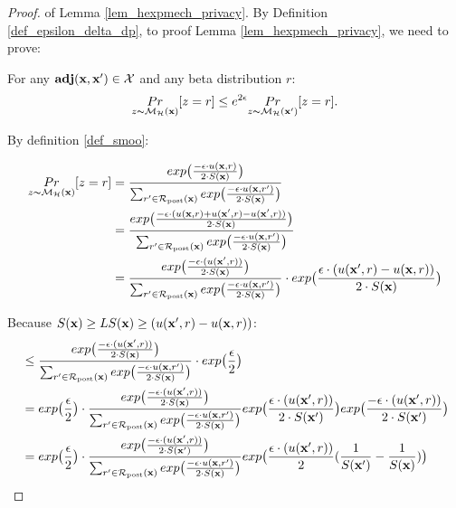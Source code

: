 \documentclass{article}
\begin{document}
\begin{proof} of Lemma \ref{lem_hexpmech_privacy}.
  By Definition \ref{def_epsilon_delta_dp}, to proof Lemma \ref{lem_hexpmech_privacy}, we need to prove:

  For any $\adj{\dataobs}{\dataobs'} \in \mathcal{X}$ and any beta distribution $r$:
  \begin{equation*}
  \hexpmechPr{\dataobs}{z = r} \leq e^{2\epsilon} \hexpmechPr{\dataobs'}{z = r}. 
  \end{equation*}

  By definition \ref{def_smoo}:

  \begin{equation*}
  \begin{split}
  \hexpmechPr{\dataobs}{z = r} 
  & = \frac {exp\big(\frac{-\epsilon\cdot\ux{r}}{2\cdot S(\dataobs)}\big)}{\unomalizer{\dataobs}} \\
  & = \frac {exp\big(
  \frac{-\epsilon\cdot(\ux{r} + \uxadj{r} - \uxadj{r})}{2\cdot S(\dataobs)}
  \big)}
  {\unomalizer{\dataobs}} \\
  & = \frac {exp\big(
  \frac{-\epsilon\cdot(\uxadj{r})}{2\cdot S(\dataobs)}
  \big)}
  {\unomalizer{\dataobs}}
  \cdot exp\big( \frac{\epsilon\cdot(\uxadj{r} - \ux{r})}{2\cdot S(\dataobs)} \big)\\
  \end{split}
  \end{equation*}

  Because $S(\dataobs) \geq LS(\dataobs) \geq (\uxadj{r} - \ux{r})$:
  \begin{equation*}
  \begin{split}
  & \leq \frac {exp\big(
  \frac{-\epsilon\cdot(\uxadj{r})}{2\cdot S(\dataobs)}
  \big)}
  {\unomalizer{\dataobs}}
  \cdot exp\big( \frac{\epsilon}{2} \big) \\
  & = exp\big( \frac{\epsilon}{2} \big) \cdot 
  \frac {
  exp
  \big(
  \frac{-\epsilon\cdot(\uxadj{r})}{2\cdot S(\dataobs)}
  \big)
  } 
  {\unomalizer{\dataobs}}
  exp
  \big(
  \frac{\epsilon\cdot(\uxadj{r})}{2\cdot S(\dataobs')}
  \big)
  exp
  \big(
  \frac{-\epsilon\cdot(\uxadj{r})}{2\cdot S(\dataobs')}
  \big)\\
  & = exp\big( \frac{\epsilon}{2} \big) \cdot 
  \frac {
  exp
  \big(
  \frac{-\epsilon\cdot(\uxadj{r})}{2\cdot S(\dataobs')}
  \big)
  } 
  {\unomalizer{\dataobs}}
  exp
  \big(
  \frac{\epsilon\cdot(\uxadj{r})}{2}(\frac{1}{S(\dataobs')} - \frac{1}{S(\dataobs)})
  \big)\\
  \end{split}
  \end{equation*}
  

\end{proof}
\end{document}
